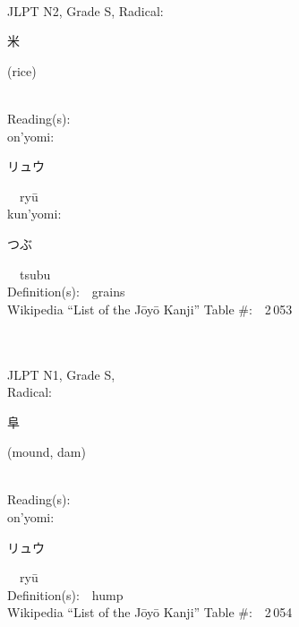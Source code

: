 \begin{multicols}{2}
{\fontsize{34pt}{40pt}  }\ \ \\  %
{JLPT N2, Grade S, Radical:\ \ {\begin{CJK}{UTF8}{min} 米 \end{CJK}} (rice) } \\
Reading(s):\ \ \\
{\hspace*{1em}}on'yomi:\ \ \\
{\hspace*{2em}}{\begin{CJK}{UTF8}{min} リュウ \end{CJK}}\ \ ry\=u\ \ \\
{\hspace*{1em}}kun'yomi:\ \ \\
{\hspace*{2em}}{\begin{CJK}{UTF8}{min} つぶ \end{CJK}}\ \ tsubu\ \ \\
Definition(s):\ \ grains \\
Wikipedia ``List of the J\=oy\=o Kanji'' Table \#:\ \ 2\,053 \\
\ \ \\
{\fontsize{34pt}{40pt}  }\ \ \\
{JLPT N1, Grade S, \\Radical:\ \ {\begin{CJK}{UTF8}{min} 阜 \end{CJK}} (mound, dam) } \\
Reading(s):\ \ \\
{\hspace*{1em}}on'yomi:\ \ \\
{\hspace*{2em}}{\begin{CJK}{UTF8}{min} リュウ \end{CJK}}\ \ ry\=u\ \ \\
Definition(s):\ \ hump \\
Wikipedia ``List of the J\=oy\=o Kanji'' Table \#:\ \ 2\,054 \\
\ \ \\
{\fontsize{34pt}{40pt}  }\ \ \\

\end{multicols}
